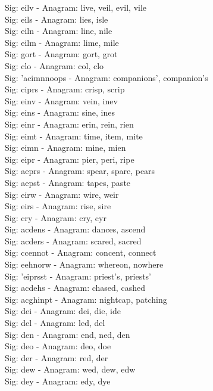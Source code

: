Sig: {eilv} - Anagram: live, veil, evil, vile \\
Sig: {eils} - Anagram: lies, isle \\
Sig: {eiln} - Anagram: line, nile \\
Sig: {eilm} - Anagram: lime, mile \\
Sig: {gort} - Anagram: gort, grot \\
Sig: {clo} - Anagram: col, clo \\
Sig: {'acimnnoops} - Anagram: companions', companion's \\
Sig: {ciprs} - Anagram: crisp, scrip \\
Sig: {einv} - Anagram: vein, inev \\
Sig: {eins} - Anagram: sine, ines \\
Sig: {einr} - Anagram: erin, rein, rien \\
Sig: {eimt} - Anagram: time, item, mite \\
Sig: {eimn} - Anagram: mine, mien \\
Sig: {eipr} - Anagram: pier, peri, ripe \\
Sig: {aeprs} - Anagram: spear, spare, pears \\
Sig: {aepst} - Anagram: tapes, paste \\
Sig: {eirw} - Anagram: wire, weir \\
Sig: {eirs} - Anagram: rise, sire \\
Sig: {cry} - Anagram: cry, cyr \\
Sig: {acdens} - Anagram: dances, ascend \\
Sig: {acders} - Anagram: scared, sacred \\
Sig: {ccennot} - Anagram: concent, connect \\
Sig: {eehnorw} - Anagram: whereon, nowhere \\
Sig: {'eiprsst} - Anagram: priest's, priests' \\
Sig: {acdehs} - Anagram: chased, cashed \\
Sig: {acghinpt} - Anagram: nightcap, patching \\
Sig: {dei} - Anagram: dei, die, ide \\
Sig: {del} - Anagram: led, del \\
Sig: {den} - Anagram: end, ned, den \\
Sig: {deo} - Anagram: deo, doe \\
Sig: {der} - Anagram: red, der \\
Sig: {dew} - Anagram: wed, dew, edw \\
Sig: {dey} - Anagram: edy, dye \\
